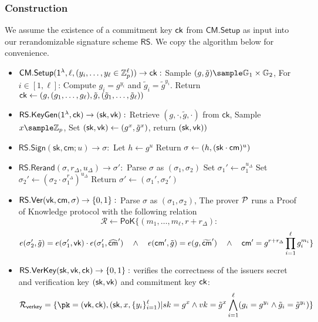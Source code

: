 \subsubsection{Construction}\label{sig-construction}
We assume the existence of a commitment key $\mathsf{ck}$ from $\mathsf{CM.Setup}$ as input into our rerandomizable signature scheme $\mathsf{RS}$. We copy the algorithm below for convenience.
\begin{itemize}
    \item $\mathsf{CM.Setup}(\mathsf{1^{\lambda}}, \ell, (y_i, \ldots, y_{\ell} \in \mathbb{Z}_p^{\ell})) \to \mathsf{ck}:$  
    Sample $(g, \tilde{g}) \sample \G_1 \times \G_2$, For $i \in [1,\ell]$: Compute $g_i = g^{y_i}$ and $\tilde{g}_i = \tilde{g}^{y_i}$. Return $\mathsf{ck} \gets (g, (g_1,\ldots,g_\ell), \tilde{g}, (\tilde{g}_1,\ldots,\tilde{g}_\ell))$
    
    \item $\mathsf{RS.KeyGen}(\mathsf{1^{\lambda}}, \mathsf{ck}) \to (\mathsf{sk}, \mathsf{vk}):$ 
        Retrieve $(g, \cdot, \tilde{g}, \cdot)$ from $\mathsf{ck}$,
        Sample $x \sample \Z_p$,
        Set $(\mathsf{sk}, \mathsf{vk}) \gets (g^x, \tilde{g}^x)$, return $(\mathsf{sk}, \mathsf{vk}))$
    
    \item $\mathsf{RS.Sign}(\mathsf{sk}, \mathsf{cm}; u) \to \sigma:$ 
        Let $h \gets g^u$
        Return $\sigma \gets (h, (\mathsf{sk} \cdot \mathsf{cm})^u)$
    
    \item $\mathsf{RS.Rerand}(\sigma, r_\Delta, u_\Delta) \to \sigma':$
        Parse $\sigma$ as $(\sigma_1, \sigma_2)$
        Set $\sigma_1' \gets \sigma_1^{u_\Delta}$
        Set $\sigma_2' \gets (\sigma_2 \cdot \sigma_1^{r_\Delta})^{u_\Delta}$
        Return $\sigma' \gets (\sigma_1', \sigma_2')$
    
    \item $\mathsf{RS.Ver}(\mathsf{vk}, \mathsf{cm}, \sigma) \to \{0,1\}:$
        Parse $\sigma$ as $(\sigma_1, \sigma_2)$, The prover $\mathcal{P}$ runs a Proof of Knowledge protocol with the following relation 
    \[
        \mathcal{R} \gets \mathsf{PoK}\{(m_1,\ldots,m_\ell, r + r_\Delta): 
    \]
    \[
         e(\sigma_2', \tilde{g}) = e(\sigma_1', \mathsf{vk})\cdot e(\sigma_1', \widehat{\mathsf{cm}}') \quad \wedge \quad
        e(\mathsf{cm}', \tilde{g}) = e(g, \widetilde{\mathsf{cm}}') \quad \wedge \quad
        \mathsf{cm}' = g^{r + r_\Delta} \prod_{i=1}^\ell g_i^{m_i}
        \}
    \]

        \item $\mathsf{RS.VerKey}(\mathsf{sk}, \mathsf{vk}, \mathsf{ck}) \to \{0,1\}:$ verifies the correctness of the issuers secret and verification key $(\mathsf{sk}, \mathsf{vk})$ and commitment key $\mathsf{ck}$:
        \[
        \mathcal{R}_{\mathsf{verkey}} = \{\pk = (\vk, \ck),(\sk, x, \{y_i\}_{i=1}^\ell) | sk = g^x \wedge vk = \tilde{g}^x \bigwedge_{i=1}^\ell (g_i = g^{y_i} \wedge \tilde{g}_i = \tilde{g}^{y_i})\}
        \]
        
\end{itemize}




